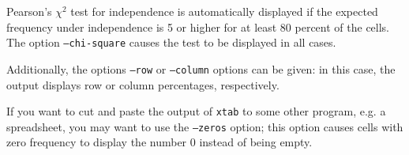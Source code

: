 Pearson's $\chi^2$ test for independence is automatically displayed
if the expected frequency under independence is 5 or higher for at
least 80 percent of the cells. The option \texttt{--chi-square} causes
the test to be displayed in all cases.

Additionally, the options \texttt{--row} or \texttt{--column} options
can be given: in this case, the output displays row or column
percentages, respectively. 

If you want to cut and paste the output of \texttt{xtab} to some other
program, e.g. a spreadsheet, you may want to use the \texttt{--zeros}
option; this option causes cells with zero frequency to display the
number 0 instead of being empty.

